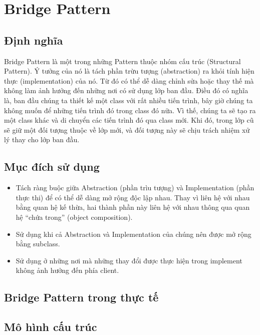 \chapter{Bridge Pattern}

\section{Định nghĩa}
Bridge Pattern là một trong những Pattern thuộc nhóm cấu trúc (Structural Pattern). Ý tưởng của nó là tách phần trừu tượng (abstraction) ra khỏi tính hiện thực (implementation) của nó. Từ đó có thể dễ dàng chỉnh sửa hoặc thay thế mà không làm ảnh hưởng đến những nơi có sử dụng lớp ban đầu. Điều đó có nghĩa là, ban đầu chúng ta thiết kế một class với rất nhiều tiến trình, bây giờ chúng ta không muốn để những tiến trình đó trong class đó nữa. Vì thế, chúng ta sẽ tạo ra một class khác và di chuyển các tiến trình đó qua class mới. Khi đó, trong lớp cũ sẽ giữ một đối tượng thuộc về lớp mới, và đối tượng này sẽ chịu trách nhiệm xử lý thay cho lớp ban đầu.

\section{Mục đích sử dụng}
\begin{itemize}
\item Tách ràng buộc giữa Abstraction (phần trìu tượng) và Implementation (phần thực thi) để có thể dễ dàng mở rộng độc lập nhau. Thay vì liên hệ với nhau bằng quan hệ kế thừa, hai thành phần này liên hệ với nhau thông qua quan hệ “chứa trong” (object composition).
\item Sử dụng khi cả Abstraction và Implementation của chúng nên được mở rộng bằng subclass.
\item Sử dụng ở những nơi mà những thay đổi được thực hiện trong implement không ảnh hưởng đến phía client.
\end{itemize}

\section{Bridge Pattern trong thực tế}

\section{Mô hình cấu trúc}
